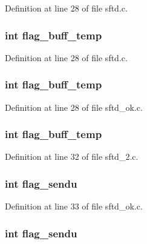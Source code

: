 Definition at line 28 of file sftd.c.

\hypertarget{group__SFTD_gab01f6df89a2c590dbf207e6e2ce01bf2}{
\subsubsection[{flag\_\-buff\_\-temp}]{\setlength{\rightskip}{0pt plus 5cm}int {\bf flag\_\-buff\_\-temp}}}
\label{group__SFTD_gab01f6df89a2c590dbf207e6e2ce01bf2}


Definition at line 28 of file sftd.c.

\hypertarget{group__SFTD_gab01f6df89a2c590dbf207e6e2ce01bf2}{
\subsubsection[{flag\_\-buff\_\-temp}]{\setlength{\rightskip}{0pt plus 5cm}int {\bf flag\_\-buff\_\-temp}}}
\label{group__SFTD_gab01f6df89a2c590dbf207e6e2ce01bf2}


Definition at line 28 of file sftd\_\-ok.c.

\hypertarget{group__SFTD_gab01f6df89a2c590dbf207e6e2ce01bf2}{
\subsubsection[{flag\_\-buff\_\-temp}]{\setlength{\rightskip}{0pt plus 5cm}int {\bf flag\_\-buff\_\-temp}}}
\label{group__SFTD_gab01f6df89a2c590dbf207e6e2ce01bf2}


Definition at line 32 of file sftd\_\-2.c.

\hypertarget{group__SFTD_ga2154b2a39f2c03e7fd41ea4c626dfefc}{
\subsubsection[{flag\_\-sendu}]{\setlength{\rightskip}{0pt plus 5cm}int {\bf flag\_\-sendu}}}
\label{group__SFTD_ga2154b2a39f2c03e7fd41ea4c626dfefc}


Definition at line 33 of file sftd\_\-ok.c.

\hypertarget{group__SFTD_ga2154b2a39f2c03e7fd41ea4c626dfefc}{
\subsubsection[{flag\_\-sendu}]{\setlength{\rightskip}{0pt plus 5cm}int {\bf flag\_\-sendu}}}
\label{group__SFTD_ga2154b2a39f2c03e7fd41ea4c626dfefc}


